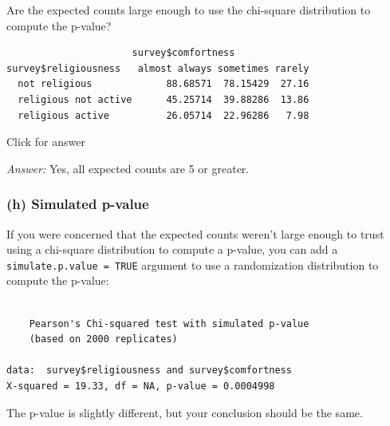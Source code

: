 \documentclass[
]{book}
\newenvironment{Shaded}{\begin{snugshade}}{\end{snugshade}}
\newcommand{\AttributeTok}[1]{\textcolor[rgb]{0.77,0.63,0.00}{#1}}
\newcommand{\ConstantTok}[1]{\textcolor[rgb]{0.00,0.00,0.00}{#1}}
\newcommand{\FunctionTok}[1]{\textcolor[rgb]{0.00,0.00,0.00}{#1}}
\newcommand{\NormalTok}[1]{#1}
\newcommand{\SpecialCharTok}[1]{\textcolor[rgb]{0.00,0.00,0.00}{#1}}
\begin{document}
Are the expected counts large enough to use the chi-square distribution to compute the p-value?

\begin{Shaded}
\end{Shaded}

\begin{verbatim}
                      survey$comfortness
survey$religiousness   almost always sometimes rarely
  not religious             88.68571  78.15429  27.16
  religious not active      45.25714  39.88286  13.86
  religious active          26.05714  22.96286   7.98
\end{verbatim}

Click for answer

\emph{Answer:} Yes, all expected counts are 5 or greater.

\hypertarget{h-simulated-p-value}{%
\subsubsection{(h) Simulated p-value}\label{h-simulated-p-value}}

If you were concerned that the expected counts weren't large enough to trust using a chi-square distribution to compute a p-value, you can add a \texttt{simulate.p.value\ =\ TRUE} argument to use a randomization distribution to compute the p-value:

\begin{Shaded}
\end{Shaded}

\begin{verbatim}

    Pearson's Chi-squared test with simulated p-value
    (based on 2000 replicates)

data:  survey$religiousness and survey$comfortness
X-squared = 19.33, df = NA, p-value = 0.0004998
\end{verbatim}

The p-value is slightly different, but your conclusion should be the same.
\end{document}
